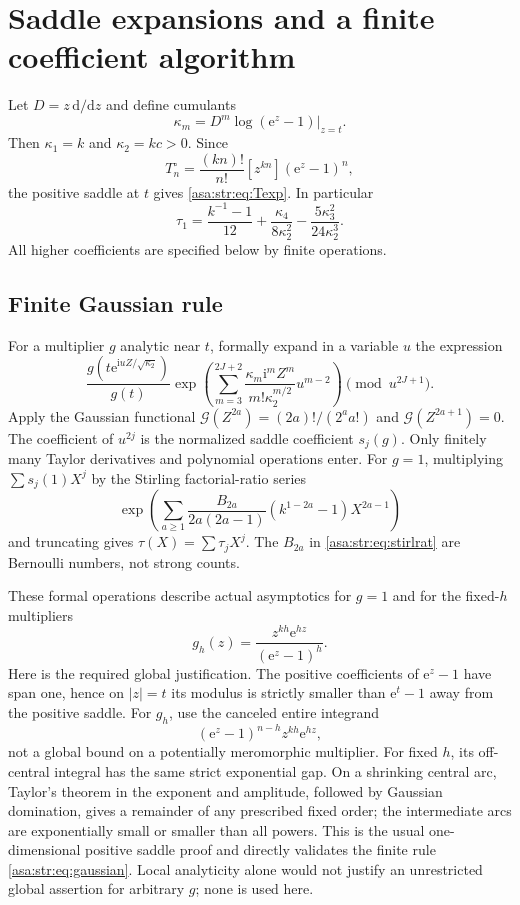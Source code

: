 \documentclass[11pt,letterpaper]{article}
\theoremstyle{remark}\newtheorem{remark}[theorem]{Remark}
\numberwithin{equation}{section}
\newcommand{\ee}{\mathrm e}
\newcommand{\ii}{\mathrm i}
\begin{document}
\section{Saddle expansions and a finite coefficient algorithm}\label{asa:str:sec:algorithm}
Let $D=z\,\mathrm d/\mathrm d z$ and define cumulants
\[
 \kappa_m=D^m\log(\ee^z-1)\big|_{z=t}.
\]
Then $\kappa_1=k$ and $\kappa_2=kc>0$. Since
\[
 T^{\circ}_n=\frac{(kn)!}{n!}[z^{kn}](\ee^z-1)^n,
\]
the positive saddle at $t$ gives \eqref{asa:str:eq:Texp}. In particular
\begin{equation}\label{asa:str:eq:tau1}
 \tau_1=\frac{k^{-1}-1}{12}
 +\frac{\kappa_4}{8\kappa_2^2}
 -\frac{5\kappa_3^2}{24\kappa_2^3}.
\end{equation}
All higher coefficients are specified below by finite operations.

\subsection{Finite Gaussian rule}
For a multiplier $g$ analytic near $t$, formally expand in a variable $u$ the expression
\begin{equation}\label{asa:str:eq:gaussian}
 \frac{g(t\ee^{\ii uZ/\sqrt{\kappa_2}})}{g(t)}
 \exp\left(\sum_{m=3}^{2J+2}
 \frac{\kappa_m\ii^mZ^m}{m!\kappa_2^{m/2}}u^{m-2}\right)
 \pmod{u^{2J+1}}.
\end{equation}
Apply the Gaussian functional $\mathcal G(Z^{2a})=(2a)!/(2^aa!)$ and $\mathcal G(Z^{2a+1})=0$. The coefficient of $u^{2j}$ is the normalized saddle coefficient $s_j(g)$. Only finitely many Taylor derivatives and polynomial operations enter. For $g=1$, multiplying $\sum s_j(1)X^j$ by the Stirling factorial-ratio series
\begin{equation}\label{asa:str:eq:stirlrat}
 \exp\left(\sum_{a\ge1}
 \frac{B_{2a}}{2a(2a-1)}(k^{1-2a}-1)X^{2a-1}\right)
\end{equation}
and truncating gives $\tau(X)=\sum\tau_jX^j$. The $B_{2a}$ in \eqref{asa:str:eq:stirlrat} are Bernoulli numbers, not strong counts.

These formal operations describe actual asymptotics for $g=1$ and for the fixed-$h$ multipliers
\begin{equation}\label{asa:str:eq:gh}
 g_h(z)=\frac{z^{kh}\ee^{hz}}{(\ee^z-1)^h}.
\end{equation}
Here is the required global justification. The positive coefficients of $\ee^z-1$ have span one, hence on $|z|=t$ its modulus is strictly smaller than $\ee^t-1$ away from the positive saddle. For $g_h$, use the canceled entire integrand
\[
 (\ee^z-1)^{n-h}z^{kh}\ee^{hz},
\]
not a global bound on a potentially meromorphic multiplier. For fixed $h$, its off-central integral has the same strict exponential gap. On a shrinking central arc, Taylor's theorem in the exponent and amplitude, followed by Gaussian domination, gives a remainder of any prescribed fixed order; the intermediate arcs are exponentially small or smaller than all powers. This is the usual one-dimensional positive saddle proof and directly validates the finite rule \eqref{asa:str:eq:gaussian}. Local analyticity alone would not justify an unrestricted global assertion for arbitrary $g$; none is used here.
\end{document}
